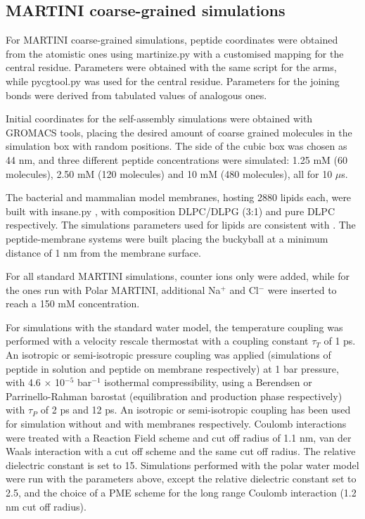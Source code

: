 \subsection{MARTINI coarse-grained simulations} \label{sec:MARTINI_sim_det}
For MARTINI \citep{Marrink2007, Monticelli2008} coarse-grained simulations, peptide coordinates were obtained from the atomistic ones using martinize.py \citep{DeJong2013} with a customised mapping for the central residue. Parameters were obtained with the same script for the arms, while pycgtool.py \citep{Graham2017} was used for the central residue. Parameters for the joining bonds were derived from tabulated values of analogous ones.

Initial coordinates for the self-assembly simulations were obtained with GROMACS tools, placing the desired amount of coarse grained molecules in the simulation box with random positions.
%
The side of the cubic box was chosen as 44 nm, and three different peptide concentrations were simulated: 1.25 mM (60 molecules), 2.50 mM (120 molecules) and 10 mM (480 molecules), all for 10 $\mu$s.

The bacterial and mammalian model membranes, hosting 2880 lipids each, were built with insane.py \citep{Wassenaar2015}, with composition DLPC/DLPG (3:1) and pure DLPC respectively. The simulations parameters used for lipids are consistent with \citet{SiewertJ.Marrink2003}. The peptide-membrane systems were built placing the buckyball at a minimum distance of 1 nm from the membrane surface.

For all standard MARTINI simulations, counter ions only were added, while for the ones run with Polar MARTINI, additional Na$^+$ and Cl$^-$ were inserted to reach a 150 mM concentration.

For simulations with the standard water model, the temperature coupling was performed with a velocity rescale thermostat \citep{Bussi2007} with a coupling constant $\tau _T$ of 1 ps. An isotropic or semi-isotropic pressure coupling was applied (simulations of peptide in solution and peptide on membrane respectively) at 1 bar pressure, with 4.6 $\times$ 10$^{-5}$ bar$^{-1}$ isothermal compressibility, using a Berendsen \citep{Berendsen1984} or Parrinello-Rahman barostat \citep{Parrinello1981} (equilibration and production phase respectively) with $\tau _P$ of 2 ps and 12 ps. An isotropic or semi-isotropic coupling has been used for simulation without and with membranes respectively.
%
Coulomb interactions were treated with a Reaction Field scheme \citep{Tironi1995} and cut off radius of 1.1 nm, van der Waals interaction with a cut off scheme and the same cut off radius. The relative dielectric constant is set to 15.
%
Simulations performed with the polar water model were run with the parameters above, except the relative dielectric constant set to 2.5, and the choice of a PME scheme for the long range Coulomb interaction (1.2 nm cut off radius).

